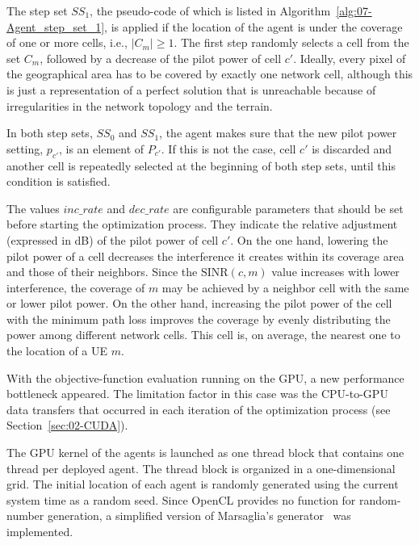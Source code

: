 The step set $SS_{1}$, the pseudo-code of which is listed in Algorithm~\ref{alg:07-Agent_step_set_1},
is applied if the location of the agent is under the coverage of one
or more cells, i.e., $\vert C_{m}\vert\ge1$. The first step randomly
selects a cell from the set $C_{m}$, followed by a decrease of the
pilot power of cell $c'$. Ideally, every pixel of the geographical
area has to be covered by exactly one network cell, although this
is just a representation of a perfect solution that is unreachable
because of irregularities in the network topology and the terrain.

In both step sets, $SS_{0}$ and $SS_{1}$, the agent makes sure that
the new pilot power setting, $p_{c'}$, is an element of $P_{c'}$.
If this is not the case, cell $c'$ is discarded and another cell
is repeatedly selected at the beginning of both step sets, until this
condition is satisfied.

The values $inc\_rate$ and $dec\_rate$ are configurable parameters
that should be set before starting the optimization process. They
indicate the relative adjustment (expressed in dB) of the pilot power
of cell $c'$. On the one hand, lowering the pilot power of a cell
decreases the interference it creates within its coverage area and
those of their neighbors. Since the $\mathrm{SINR}(c,m)$ value increases
with lower interference, the coverage of $m$ may be achieved by a
neighbor cell with the same or lower pilot power. On the other hand,
increasing the pilot power of the cell with the minimum path loss
improves the coverage by evenly distributing the power among different
network cells. This cell is, on average, the nearest one to the location
of a UE $m$.

\bigskip{}


With the objective-function evaluation running on the GPU, a new performance
bottleneck appeared. The limitation factor in this case was the CPU-to-GPU
data transfers that occurred in each iteration of the optimization
process (see Section~\ref{sec:02-CUDA}).

The GPU kernel of the agents is launched as one thread block that
contains one thread per deployed agent. The thread block is organized
in a one-dimensional grid. The initial location of each agent is randomly
generated using the current system time as a random seed. Since OpenCL
provides no function for random-number generation, a simplified version
of Marsaglia's generator~\cite{Marsaglia_Seeds.for.random.number.generator:2003}
was implemented.

